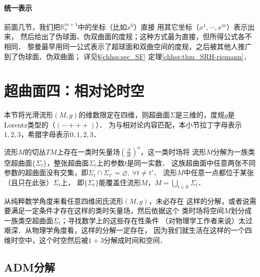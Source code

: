 \paragraph{统一表示}
前面几节，我们把$\mathbb{R}^{m+1}_\nu$中的坐标（比如$x^0$）直接
用其它坐标（$x^1,\cdots,x^m$）表示出来，
然后给出了伪球面、伪双曲面的度规；这种方式最为直接，但所得公式各不相同．
黎曼最早用同一公式表示了超球面和双曲空间的度规，之后被其他人推广到了伪球面、伪双曲面；
详见\S \ref{chhss:sec_SF} 定理\ref{chhss:thm_SRH-riemann}．




\section{超曲面四：相对论时空}\label{chsm:sec_3+1decomposition}
本节将光滑流形$(M,g)$的维数限定在四维，则超曲面$\Sigma$是三维的，度规$g$是Lorentz类型的（$(-+++)$）．
为与相对论内容匹配，本小节拉丁字母表示$1,2,3$，希腊字母表示$0,1,2,3$．


流形$M$的切丛$TM$上存在一类时矢量场$(\frac{\partial }{\partial t})^a$，这一类时场将
流形$M$分解为一族类空超曲面$\{\Sigma_t\}$，整张超曲面$\Sigma_t$上的参数$t$是同一实数．
这族超曲面中任意两张不同参数的超曲面没有交集，即$\Sigma_t \cap \Sigma_{t'}=\varnothing,
\ \forall t \neq t' $．
流形$M$中任意一点都位于某张（且只在此张）$\Sigma_t$上，
即$\{\Sigma_t\}$能覆盖住流形$M$，$M=\bigcup_{t\in\mathbb{R}} \Sigma_t$．

从纯粹数学角度来看任意四维闵氏流形$(M,g)$，未必存在
这样的分解，或者说需要满足一定条件才存在这样的类时矢量场，然后依据这个
类时场将空间$M$划分成一族类空超曲面$\Sigma_t$；寻找数学上的这些存在性条件
（对物理学工作者来说）太过艰深．从物理学角度看，这样的分解一定存在，
因为我们就生活在这样的一个四维时空中，这个时空然后被$1+3$分解成时间和空间．




\subsection{ADM分解}\label{chsm:sec_ADM}

